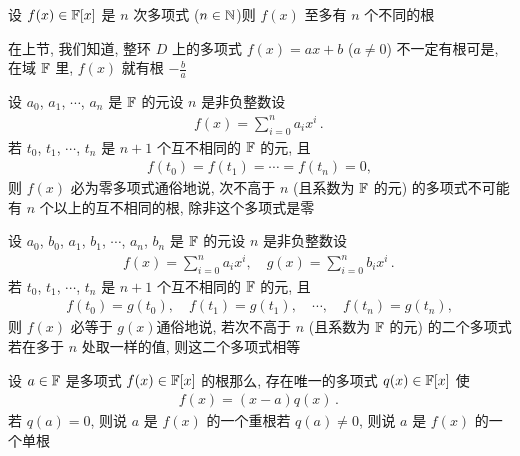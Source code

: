 \begin{proposition}
    设 $f(x) \in \mathbb{F}[x]$ 是 $n$ 次多项式 ($n \in \mathbb{N}$)\period 则 $f(x)$ 至多有 $n$ 个不同的根\period
\end{proposition}

\begin{remark}
    在上节, 我们知道, 整环 $D$ 上的多项式 $f(x) = ax + b$ ($a \neq 0$) 不一定有根\period 可是, 在域 $\mathbb{F}$ 里, $f(x)$ 就有根 $-\frac{b}{a}$\period
\end{remark}

\begin{proposition}
    设 $a_0$, $a_1$, $\cdots$, $a_n$ 是 $\mathbb{F}$ 的元\period 设 $n$ 是非负整数\period 设
    \begin{align*}
        f(x) = \sum_{i = 0}^n a_i x^i \period
    \end{align*}
    若 $t_0$, $t_1$, $\cdots$, $t_n$ 是 $n+1$ 个互不相同的 $\mathbb{F}$ 的元, 且
    \begin{align*}
        f(t_0) = f(t_1) = \cdots = f(t_n) = 0,
    \end{align*}
    则 $f(x)$ 必为零多项式\period 通俗地说, 次不高于 $n$ (且系数为 $\mathbb{F}$ 的元) 的多项式不可能有 $n$ 个以上的互不相同的根, 除非这个多项式是零\period
\end{proposition}

\begin{proposition}
    设 $a_0$, $b_0$, $a_1$, $b_1$, $\cdots$, $a_n$, $b_n$ 是 $\mathbb{F}$ 的元\period 设 $n$ 是非负整数\period 设
    \begin{align*}
        f(x) = \sum_{i = 0}^n a_i x^i, \quad g(x) = \sum_{i = 0}^n b_i x^i \period
    \end{align*}
    若 $t_0$, $t_1$, $\cdots$, $t_n$ 是 $n+1$ 个互不相同的 $\mathbb{F}$ 的元, 且
    \begin{align*}
        f(t_0) = g(t_0), \quad f(t_1) = g(t_1), \quad \cdots, \quad f(t_n) = g(t_n),
    \end{align*}
    则 $f(x)$ 必等于 $g(x)$\period 通俗地说, 若次不高于 $n$ (且系数为 $\mathbb{F}$ 的元) 的二个多项式若在多于 $n$ 处取一样的值, 则这二个多项式相等\period
\end{proposition}

\begin{definition}
    设 $a \in \mathbb{F}$ 是多项式 $f(x) \in \mathbb{F}[x]$ 的根\period 那么, 存在唯一的多项式 $q(x) \in \mathbb{F}[x]$ 使
    \begin{align*}
        f(x) = (x - a) q(x) \period
    \end{align*}
    若 $q(a) = 0$, 则说 $a$ 是 $f(x)$ 的一个重根\period 若 $q(a) \neq 0$, 则说 $a$ 是 $f(x)$ 的一个单根\period
\end{definition}


